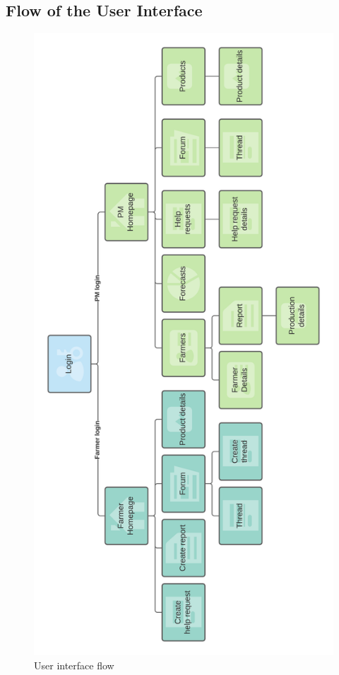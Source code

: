 \documentclass[10pt]{article} %
\begin{document}
\subsection{Flow of the User Interface}
\begin{figure}[h!]
    \centering
    \centerline{\includegraphics[scale=0.15]{images/uimockups/ui_flow.png}}
    \caption{User interface flow}
    \label{fig:ui_flow}
\end{figure}
\newpage
\end{document}
